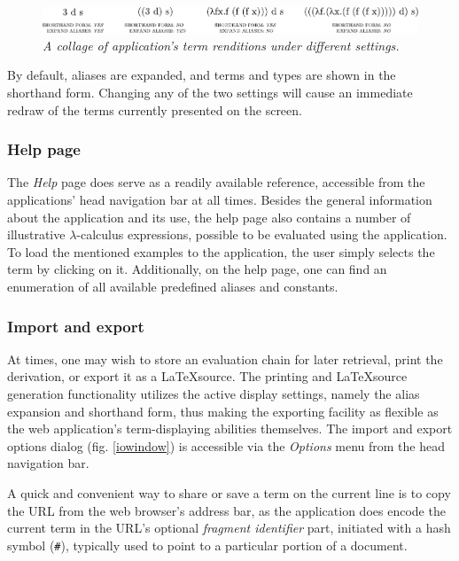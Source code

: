 \documentclass[table, a4paper, 10pt]{article}
\begin{document}
\begin{figure}[H]\centering
\includegraphics[scale=0.74]{displayopts2.pdf}
\vspace{-0.4cm}
\caption{\textit{A collage of application's term renditions under different settings.}}\label{displayopts}
\end{figure}

\noindent
By default, aliases are expanded, and terms and types are shown in the shorthand form.
Changing any of the two settings will cause an immediate redraw of the terms currently
presented on the screen.

\subsubsection{Help page}
The \textit{Help} page does serve as a readily available reference, accessible from the 
applications' head navigation bar at all times. Besides the general information about the application
and its use, the help page also contains a number of illustrative $\lambda$-calculus expressions, possible to be
evaluated using the application. To load the mentioned examples to the application, the user simply
selects the term by clicking on it. Additionally, on the help page, one can find
an enumeration of all available predefined aliases and constants.

\subsubsection{Import and export} \label{sec:io}
At times, one may wish to store an evaluation chain for later retrieval, print the derivation,
or export it as a \LaTeX\;source.
The printing and \LaTeX\;source generation functionality utilizes the active display settings,
namely the alias expansion and shorthand form, thus making the exporting
facility as flexible as the web application's term-displaying abilities themselves.
The import and export options dialog (fig. \ref{iowindow}) is accessible
via the \textit{Options} menu from the head navigation bar.

A quick and convenient way to share or save a term on the current line is to copy the
URL from the web browser's address bar, as the application does encode
the current term in the URL's optional \textit{fragment identifier} part,
initiated with a hash symbol (\texttt{\#}), typically used to point to a particular 
portion of a document.
\end{document}
